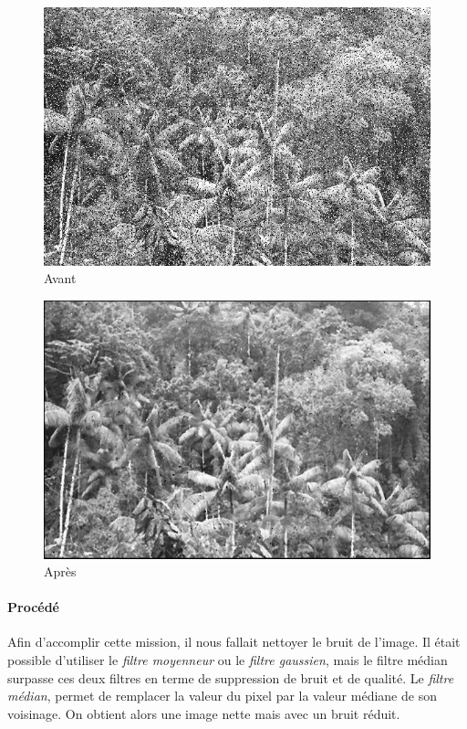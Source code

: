 	\begin{figure}[h]
	\centering
		\begin{multicols}{2}
		\includegraphics[scale=0.45]{images/Gliese_581d-V2.png}
		Avant

		\includegraphics[scale=0.45]{images/MissionX2v2.png}
		Après
		\end{multicols}
	\end{figure}
	\vspace{-0.9cm}

	\paragraph{Procédé}
	
		Afin d'accomplir cette mission, il nous fallait nettoyer le bruit de l'image. Il était possible d'utiliser le \emph{filtre moyenneur} ou le \emph{filtre gaussien}, mais le filtre médian surpasse ces deux filtres en terme de suppression de bruit et de qualité. Le \emph{filtre médian}, permet de remplacer la valeur du pixel par la valeur médiane de son voisinage. On obtient alors une image nette mais avec un bruit réduit.